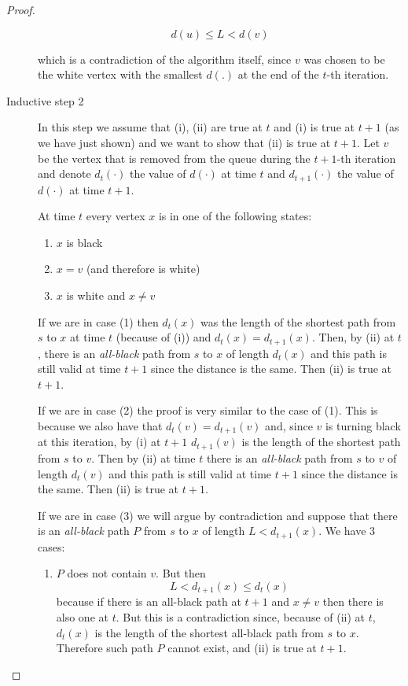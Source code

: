 \documentclass[12pt]{extarticle}
\begin{document}
\begin{proof}
\begin{description}
            $$
                d(u) \leq L < d(v)
            $$

            which is a contradiction of the algorithm itself, since $v$ was chosen to be the white vertex with the smallest $d(.)$ at the end of the $t$-th iteration.

        \item[Inductive step 2]
            In this step we assume that (i), (ii) are true at $t$ and (i) is true at $t+1$ (as we have just shown) and we want to show that (ii) is true at $t+1$.
            Let $v$ be the vertex that is removed from the queue during the $t+1$-th iteration and denote $d_t(\cdot)$ the value of $d(\cdot)$ at time $t$ and $d_{t+1}(\cdot)$ the value of $d(\cdot)$ at time $t+1$.

            At time $t$ every vertex $x$ is in one of the following states:
            \begin{enumerate}
                \item $x$ is black
                \item $x = v$ (and therefore is white)
                \item $x$ is white and $x \neq v$
            \end{enumerate}

            If we are in case (1) then $d_t(x)$ was the length of the shortest path from $s$ to $x$ at time $t$ (because of (i)) and $d_t(x) = d_{t+1}(x)$.
            Then, by (ii) at $t$, there is an \textit{all-black} path from $s$ to $x$ of length $d_t(x)$ and this path is still valid at time $t+1$ since the distance is the same. Then (ii) is true at $t+1$.

            If we are in case (2) the proof is very similar to the case of (1).
            This is because we also have that $d_t(v) = d_{t+1}(v)$ and, since $v$ is turning black at this iteration, by (i) at $t+1$ $d_{t+1}(v)$ is the length of the shortest path from $s$ to $v$.
            Then by (ii) at time $t$ there is an \textit{all-black} path from $s$ to $v$ of length $d_t(v)$ and this path is still valid at time $t+1$ since the distance is the same. Then (ii) is true at $t+1$.

            If we are in case (3) we will argue by contradiction and suppose that there is an \textit{all-black} path $P$ from $s$ to $x$ of length $L < d_{t+1}(x)$.
            We have 3 cases:
            \begin{enumerate}[label=\alph*.]
                \item
                      $P$ does not contain $v$.
                      But then
                      $$
                          L < d_{t+1}(x) \leq d_t(x)$$
                      because if there is an all-black path at $t+1$ and $x \neq v$ then there is also one at $t$.
                      But this is a contradiction since, because of (ii) at $t$, $d_t(x)$ is the length of the shortest all-black path from $s$ to $x$. Therefore such path $P$ cannot exist, and (ii) is true at $t+1$.


\end{enumerate}
\end{description}
\end{proof}
\end{document}
